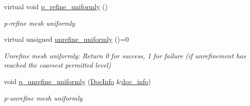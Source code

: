 \begin{DoxyCompactItemize}
virtual void \hyperlink{classoomph_1_1RefineableMeshBase_a648a6fd1b186baf1b01c07b879280480}{p\+\_\+refine\+\_\+uniformly} ()
\begin{DoxyCompactList}\small\item\em p-\/refine mesh uniformly \end{DoxyCompactList}\item 
virtual unsigned \hyperlink{classoomph_1_1RefineableMeshBase_a5bbd5c85e7c5c9e75c5a28155ac3f956}{unrefine\+\_\+uniformly} ()=0
\begin{DoxyCompactList}\small\item\em Unrefine mesh uniformly\+: Return 0 for success, 1 for failure (if unrefinement has reached the coarsest permitted level) \end{DoxyCompactList}\item 
void \hyperlink{classoomph_1_1RefineableMeshBase_a6a59e7e2e6caac875091a15e79487953}{p\+\_\+unrefine\+\_\+uniformly} (\hyperlink{classoomph_1_1DocInfo}{Doc\+Info} \&\hyperlink{classoomph_1_1RefineableMeshBase_a266f8b2a1499cc2ae7b24b19813923ee}{doc\+\_\+info})
\begin{DoxyCompactList}\small\item\em p-\/unrefine mesh uniformly \end{DoxyCompactList}\end{DoxyCompactItemize}
